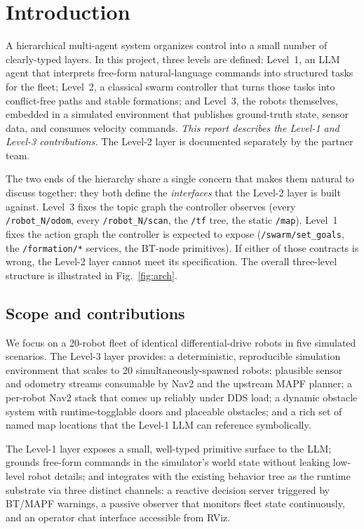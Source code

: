 \documentclass[conference]{IEEEtran}
\begin{document}
\section{Introduction}

A hierarchical multi-agent system organizes control into a
small number of clearly-typed layers. In this project, three
levels are defined: Level~1, an LLM agent that interprets
free-form natural-language commands into structured tasks for
the fleet; Level~2, a classical swarm controller that turns
those tasks into conflict-free paths and stable formations;
and Level~3, the robots themselves, embedded in a simulated
environment that publishes ground-truth state, sensor data,
and consumes velocity commands. \emph{This report describes
the Level-1 and Level-3 contributions.} The Level-2 layer is
documented separately by the partner team.

The two ends of the hierarchy share a single concern that
makes them natural to discuss together: they both define the
\emph{interfaces} that the Level-2 layer is built against.
Level~3 fixes the topic graph the controller observes (every
\texttt{/robot\_N/odom}, every \texttt{/robot\_N/scan}, the
\texttt{/tf} tree, the static \texttt{/map}). Level~1 fixes
the action graph the controller is expected to expose
(\texttt{/swarm/set\_goals}, the \texttt{/formation/*}
services, the BT-node primitives). If either of those
contracts is wrong, the Level-2 layer cannot meet its
specification. The overall three-level structure is illustrated
in Fig.~\ref{fig:arch}.

\subsection*{Scope and contributions}

We focus on a 20-robot fleet of identical differential-drive
robots in five simulated scenarios. The Level-3 layer provides:
a deterministic, reproducible simulation environment that scales
to 20 simultaneously-spawned robots; plausible sensor and
odometry streams consumable by Nav2 and the upstream MAPF
planner; a per-robot Nav2 stack that comes up reliably under
DDS load; a dynamic obstacle system with runtime-togglable doors
and placeable obstacles; and a rich set of named map locations
that the Level-1 LLM can reference symbolically.

The Level-1 layer exposes a small, well-typed primitive surface
to the LLM; grounds free-form commands in the simulator's world
state without leaking low-level robot details; and integrates
with the existing behavior tree as the runtime substrate via
three distinct channels: a reactive decision server triggered
by BT/MAPF warnings, a passive observer that monitors fleet
state continuously, and an operator chat interface accessible
from RViz.
\end{document}
